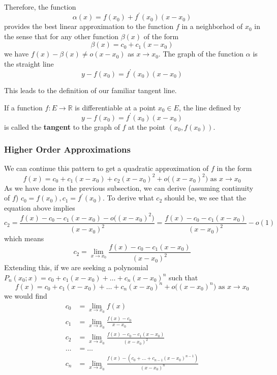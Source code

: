   Therefore, the function 
  \[\alpha (x) = f(x_0) + f^\prime (x_0) (x - x_0)\]
  provides the best linear approximation to the function $f$ in a neighborhod of $x_0$ in the sense that for any other function $\beta(x)$ of the form 
  \[\beta(x) = c_0 + c_1 (x - x_0)\]
  we have $f(x) - \beta(x) \neq o(x - x_0)$ as $x \rightarrow x_0$. The graph of the function $\alpha$ is the straight line
  \[y - f(x_0) = f^\prime (x_0) (x - x_0)\]

  This leads to the definition of our familiar tangent line. 

  \begin{definition}
    If a function $f: E \longrightarrow \mathbb{R}$ is differentiable at a point $x_0 \in E$, the line defined by
    \[y - f(x_0) = f^\prime (x_0) (x - x_0)\]
    is called the \textbf{tangent} to the graph of $f$ at the point $(x_0, f(x_0))$. 
  \end{definition}

  \subsubsection{Higher Order Approximations}
  We can continue this pattern to get a quadratic approximation of $f$ in the form
  \[f(x) = c_0 + c_1 (x - x_0) + c_2 (x - x_0)^2 + o\big((x - x_0)^2 \big) \text{ as } x \rightarrow x_0\]
  As we have done in the previous subsection, we can derive (assuming continuity of $f$) $c_0 = f(x_0), c_1 = f^\prime (x_0)$. To derive what $c_2$ should be, we see that the equation above implies
  \[c_2 = \frac{f(x) - c_0 - c_1 (x - x_0) - o\big((x - x_0)^2 \big)}{(x - x_0)^2} = \frac{f(x) - c_0 - c_1 (x - x_0)}{(x - x_0)^2} - o(1)\]
  which means
  \[c_2 = \lim_{x \rightarrow x_0} \frac{f(x) - c_0 - c_1 (x - x_0)}{(x - x_0)^2}\]
  Extending this, if we are seeking a polynomial $P_n(x_0; x) = c_0 + c_1 (x - x_0) + \ldots + c_n (x - x_0)^n$ such that
  \[f(x) = c_0 + c_1 (x - x_0) + \ldots + c_n (x - x_0)^n + o\big((x - x_0)^n\big) \text{ as } x \rightarrow x_0\]
  we would find 
  \begin{align*}
      c_0 & = \lim_{x \rightarrow x_0} f(x) \\
      c_1 & = \lim_{x \rightarrow x_0} \frac{f(x) - c_0}{x - x_0} \\
      c_2 & = \lim_{x \rightarrow x_0} \frac{f(x) - c_0 - c_1 (x - x_0)}{(x - x_0)^2} \\
      \ldots & = \ldots \\
      c_n & = \lim_{x \rightarrow x_0} \frac{f(x) - (c_0 + \ldots + c_{n-1}(x - x_0)^{n-1})}{(x - x_0)^n}
  \end{align*}

